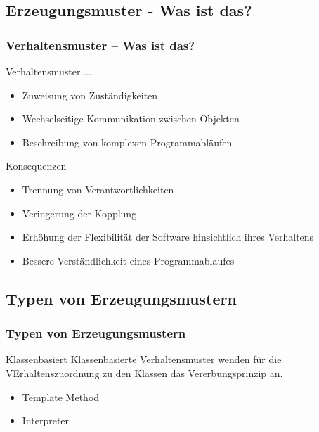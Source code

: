 \subsection*{Erzeugungsmuster - Was ist das?}
\begin{frame}
	\frametitle{Verhaltensmuster -- Was ist das?}
	\begin{block}{Verhaltensmuster ...}
	\begin{itemize}
		\item Zuweisung von Zuständigkeiten
		\item Wechselseitige Kommunikation zwischen Objekten
		\item Beschreibung von komplexen Programmabläufen
	\end{itemize}
	\end{block}	
	\begin{block}{Konsequenzen}
	\begin{itemize}
		\item Trennung von Verantwortlichkeiten
		\item Veringerung der Kopplung 
		\item Erhöhung der Flexibilität der Software hinsichtlich ihres Verhaltens
		\item Bessere Verständlichkeit eines Programmablaufes
	\end{itemize}
	\end{block}	
\end{frame}

\subsection*{Typen von Erzeugungsmustern}
\begin{frame}
	\frametitle{Typen von Erzeugungsmustern}
	\begin{block}{Klassenbasiert}
		Klassenbasierte Verhaltensmuster wenden für die VErhaltenszuordnung zu den Klassen das Vererbungsprinzip an. 
		\begin{itemize}
			\item Template Method
			\item Interpreter
		\end{itemize} 	
	\end{block}

	
\end{frame}

